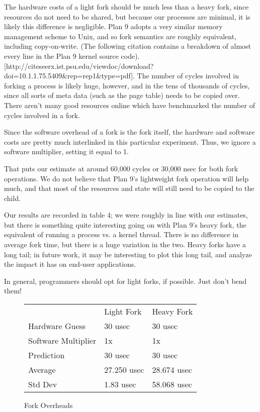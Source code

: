 \documentclass[letterpaper,twocolumn,10pt]{article}
\begin{document}
The hardware costs of a light fork should be much less than a heavy fork, since
resources do not need to be shared, but because our processes are minimal, it
is likely this difference is negligible. Plan 9 adopts a very similar memory management
scheme to Unix, and so fork semantics are roughly equivalent, including copy-on-write. (The 
following citation contains a breakdown of almost every line in the Plan 9 kernel source code).
[http://citeseerx.ist.psu.edu/viewdoc/download?doi=10.1.1.75.5409&rep=rep1&type=pdf]. The number
of cycles involved in forking a process is likely huge, however, and in the tens of thousands of 
cycles, since all sorts of meta data (such as the page table) needs to be copied over. There 
aren't many good resources online which have benchmarked the number of cycles involved in a fork.

Since the software overhead of a fork is the fork itself, the hardware and software costs are 
pretty much interlinked in this particular experiment. Thus, we ignore a software multiplier, setting it
equal to 1. 

That puts our estimate at around 60,000 cycles or 30,000 nsec for both fork operations. We do not 
believe that Plan 9's lightweight fork operation will help much, and that most of the resources 
and state will still need to be copied to the child.

Our results are recorded in table 4; we were roughly in line with our estimates, but there is something quite interesting going on with Plan 9's heavy fork, the equivalent of running a process vs. a kernel thread. There is no difference in average fork time, but there is a huge variation in the two. Heavy forks have a long tail; in future work, it may be interesting to plot this long tail, and analyze the impact it has on end-user applications.

In general, programmers should opt for light forks, if possible. Just don't bend them!

\begin{figure}
	\centering
\begin{tabular}{lll}
        & Light Fork & Heavy Fork \\
Hardware Guess & 30 usec & 30 usec \\
Software Multiplier & 1x & 1x \\
Prediction & 30 usec & 30 usec \\
Average & 27.250  usec & 28.674  usec \\
Std Dev & 1.83 usec & 58.068 usec                  
\end{tabular}
\caption{Fork Overheads}
\label{tab:forkoverheads}
\end{figure}
\end{document}
